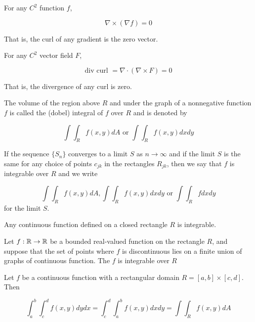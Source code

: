 \begin{thm*}
	For any $C^2$ function $f$, 
	
	$$\nabla \times (\nabla f) = 0$$
	
	That is, the curl of any gradient is the zero vector.	
\end{thm*}

\begin{thm*}
	For any $C^2$	vector field  $F$,
	
	$$\text{div curl } = \nabla \cdot (\nabla \times F) = 0$$
	
	That is, the divergence of any curl is zero.
\end{thm*}


\begin{defn}
	The volume of the region above $R$ and under the graph of a nonnegative function $f$ is called the (dobel) integral of $f$ over $R$ and is denoted by
	
	$$\int\int_{R}f(x,y)dA \text{ or } \int\int_{R}f(x,y)dxdy$$
	
\end{defn}

\begin{defn}
	If the sequence $\{S_n\}$ converges to a limit $S$ as $n \rightarrow \infty$ and if the limit $S$ is the same for any choice of points $c_{jk}$ in the rectangles $R_{jk}$, then we say that $f$ is integrable over $R$ and we write
	
	$$\int\int_{R}f(x,y)dA, \int\int_{R}f(x,y)dxdy \text{ or } \int\int_{R}fdxdy$$ 	
	for the limit $S$.
\end{defn}

\begin{thm*}
	Any continuous function defined on a closed rectangle $R$ is integrable. 	
\end{thm*}

\begin{thm*}
	Let $f: \mathbb{R} \rightarrow \mathbb{R}$ be a bounded real-valued function on the rectangle $R$, and suppose that the set of points where $f$ is discontinuous lies on a finite union of graphs of continuous function. The $f$ is integrable over $R$	
\end{thm*}

\begin{thm*}
	Let $f$ be a continuous function with a rectangular domain $R = [a,b] \times [c,d].$ Then
	
	$$\int^{b}_{a}\int^{d}_{c}f(x,y)dydx = \int^{d}_{c} \int^{b}_{a}f(x,y)dxdy = \int\int_{R}f(x,y)dA$$	
\end{thm*}

